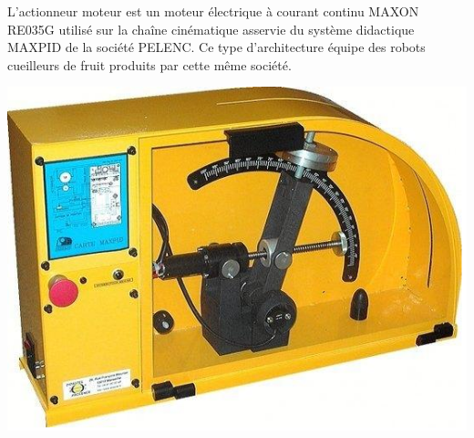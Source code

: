 \begin{minipage}{0.6\linewidth}
L'actionneur moteur est un moteur électrique à courant continu MAXON RE035G utilisé sur la chaîne cinématique asservie du système didactique MAXPID de la société PELENC. Ce type d'architecture équipe des robots cueilleurs de fruit produits par cette même société.
\end{minipage}
 \hfill
\begin{minipage}{0.35\linewidth}
 \centering\includegraphics[width=0.8\linewidth]{img/Maxpid.png}
\end{minipage}

